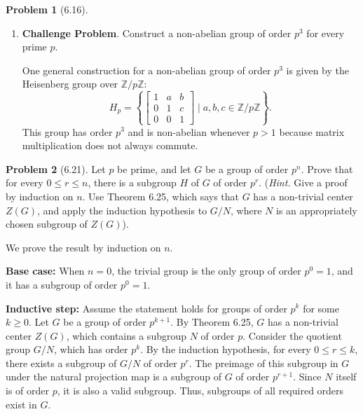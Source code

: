 \documentclass[12pt]{article}
\theoremstyle{definition}
\newtheorem{problem}{Problem}
\begin{document}
\begin{problem}[6.16]
\begin{enumerate}[label=(\alph*)]
        \item \textbf{Challenge Problem}. Construct a non-abelian group of order $p^3$ for every prime $p$.
        
        \begin{solution}
        One general construction for a non-abelian group of order $p^3$ is given by the Heisenberg group over $\mathbb{Z}/p\mathbb{Z}$:
        \[
        H_p = \left\{ \begin{bmatrix} 1 & a & b \\ 0 & 1 & c \\ 0 & 0 & 1 \end{bmatrix} \mid a, b, c \in \mathbb{Z}/p\mathbb{Z} \right\}.
        \]
        This group has order $p^3$ and is non-abelian whenever $p > 1$ because matrix multiplication does not always commute.
        \end{solution}
    \end{enumerate}
\end{problem}

\begin{problem}[6.21]
    Let $p$ be prime, and let $G$ be a group of order $p^n$. Prove that for every $0 \leq r \leq n$, there is a subgroup
    $H$ of $G$ of order $p^r$. (\textit{Hint.} Give a proof by induction on $n$. Use Theorem 6.25, which says that $G$
    has a non-trivial center $Z(G)$, and apply the induction hypothesis to $G/N$, where $N$ is an appropriately
    chosen subgroup of $Z(G)$).

    \begin{solution}
    We prove the result by induction on $n$.
    
    \textbf{Base case:} When $n = 0$, the trivial group is the only group of order $p^0 = 1$, and it has a subgroup of order $p^0 = 1$.
    
    \textbf{Inductive step:} Assume the statement holds for groups of order $p^k$ for some $k \geq 0$. Let $G$ be a group of order $p^{k+1}$. By Theorem 6.25, $G$ has a non-trivial center $Z(G)$, which contains a subgroup $N$ of order $p$. Consider the quotient group $G/N$, which has order $p^k$. By the induction hypothesis, for every $0 \leq r \leq k$, there exists a subgroup of $G/N$ of order $p^r$. The preimage of this subgroup in $G$ under the natural projection map is a subgroup of $G$ of order $p^{r+1}$. Since $N$ itself is of order $p$, it is also a valid subgroup. Thus, subgroups of all required orders exist in $G$.
    \end{solution}
\end{problem}
\end{document}
